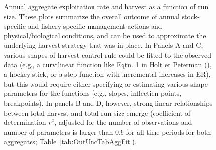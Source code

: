 \documentclass[french,11pt]{book}
\begin{document}
\begin{figure}[htb]

{\centering {} 

}

\caption{Annual aggregate exploitation rate and harvest as a function of run size. These plots summarize the overall outcome of annual stock-specific and fishery-specific management actions and physical/biological conditions, and can be used to approximate the underlying harvest strategy that was in place. In Panels A and C, various shapes of harvest control rule could be fitted to the observed data (e.g., a curvilinear function like Eqtn. 1 in Holt et Peterman (), a hockey stick, or a step function with incremental increases in ER), but this would require either specifying or estimating various shape parameters for the functions (e.g., slopes, inflection points, breakpoints). In panels B and D, however, strong linear relationships between total harvest and total run size emerge (coefficient of determination \(r^2\), adjusted for the number of observations and number of parameters is larger than 0.9 for all time periods for both aggregates; Table~\ref{tab:OutUncTabAggFit}).}\label{fig:OutUncPlotAggFit}
\end{figure}
\clearpage
\end{document}
